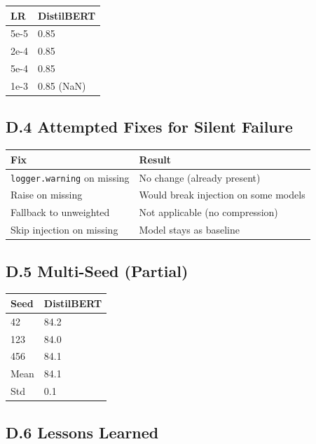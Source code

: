 \begin{table}[H]
\centering
\small
\begin{tabular}{ll}
\toprule
\textbf{LR} & \textbf{DistilBERT} \\
\midrule
5e-5 & 0.85 \\
2e-4 & 0.85 \\
5e-4 & 0.85 \\
1e-3 & 0.85 (NaN) \\
\bottomrule
\end{tabular}
\end{table}

\subsection{D.4 Attempted Fixes for Silent Failure}

\begin{table}[H]
\centering
\small
\begin{tabular}{ll}
\toprule
\textbf{Fix} & \textbf{Result} \\
\midrule
\texttt{logger.warning} on missing & No change (already present) \\
Raise on missing & Would break injection on some models \\
Fallback to unweighted & Not applicable (no compression) \\
Skip injection on missing & Model stays as baseline \\
\bottomrule
\end{tabular}
\end{table}

\subsection{D.5 Multi-Seed (Partial)}

\begin{table}[H]
\centering
\small
\begin{tabular}{ll}
\toprule
\textbf{Seed} & \textbf{DistilBERT} \\
\midrule
42 & 84.2 \\
123 & 84.0 \\
456 & 84.1 \\
Mean & 84.1 \\
Std & 0.1 \\
\bottomrule
\end{tabular}
\end{table}

\subsection{D.6 Lessons Learned}

